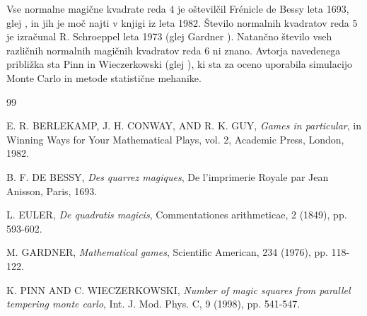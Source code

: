 \documentclass[a4paper,12pt]{article}
\theoremstyle{definition}
\begin{document}
Vse normalne magične kvadrate reda 4 je oštevilčil Frénicle de Bessy
leta 1693, glej \cite{bessy}, in jih je moč najti v knjigi \cite{berlekamp}
iz leta 1982. Število normalnih kvadratov reda 5 je izračunal
R. Schroeppel leta 1973 (glej Gardner \cite{gardner}).
Natančno število vseh različnih normalnih magičnih kvadratov reda 6 ni znano.
Avtorja navedenega približka sta Pinn in Wieczerkowski (glej \cite{pinn}), ki
sta za oceno uporabila simulacijo Monte Carlo in metode statistične mehanike.


\newpage
\begin{thebibliography}{99}

 E. R. BERLEKAMP, J. H. CONWAY, AND R. K. GUY, \emph{Games in particular}, in Winning Ways for Your Mathematical Plays, vol. 2, Academic Press, London, 1982.

 B. F. DE BESSY, \emph{Des quarrez magiques}, De l'imprimerie Royale par Jean Anisson, Paris, 1693.

 L. EULER, \emph{De quadratis magicis}, Commentationes arithmeticae, 2 (1849), pp. 593-602.

 M. GARDNER, \emph{Mathematical games}, Scientific American, 234 (1976), pp. 118-122.

 K. PINN AND C. WIECZERKOWSKI, \emph{Number of magic squares from parallel tempering monte carlo}, Int. J. Mod. Phys. C, 9 (1998), pp. 541-547.

\end{thebibliography}

\end{document}
